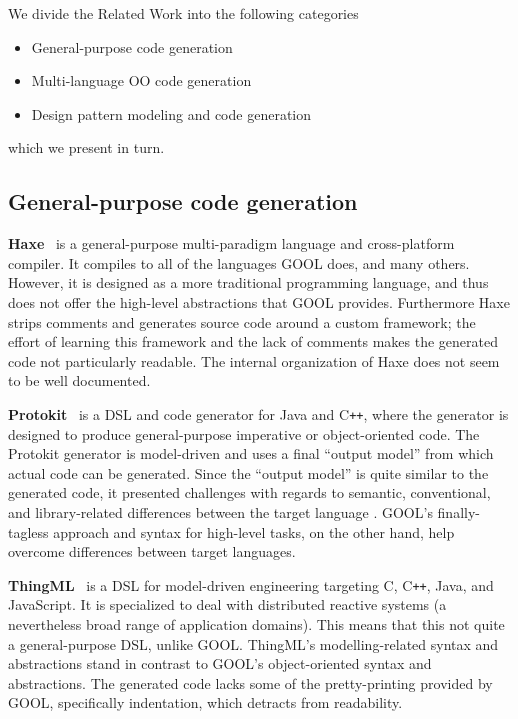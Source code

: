 \documentclass[sigplan,review,anonymous,prologue,dvipsnames]{acmart}
\newcommand{\Cplusplus}{C\texttt{++}}
\begin{document}
We divide the Related Work into the following categories
\begin{itemize}
\item General-purpose code generation
\item Multi-language OO code generation
\item Design pattern modeling and code generation
\end{itemize}
which we present in turn.

\subsection{General-purpose code generation}

\textbf{Haxe}~\cite{Haxe} is a general-purpose multi-paradigm language and cross-platform
compiler.  It compiles to all of the languages GOOL does, and many
others.  However, it is designed as a more traditional programming language, and
thus does not offer the high-level abstractions that GOOL provides. Furthermore
Haxe strips comments and generates source code around a custom framework; 
the effort of learning this framework and the lack of comments makes the generated
code not particularly readable. The internal organization of Haxe does not seem
to be well documented.

\textbf{Protokit}~\cite{kovesdan2017multi} is a DSL and code generator for Java and
\Cplusplus, where the generator is designed to produce
general-purpose imperative or object-oriented code. The Protokit generator is
model-driven and uses a final ``output model'' from which actual code can be
generated. Since the ``output model'' is quite similar to the generated
code, it presented challenges with regards to semantic, conventional, and
library-related differences between the target language
\cite{kovesdan2017multi}. GOOL's finally-tagless approach and syntax for
high-level tasks, on the other hand, help overcome differences between
target languages.

\textbf{ThingML}~\cite{harrand2016thingml} is a DSL for model-driven engineering
targeting C, \Cplusplus, Java, and JavaScript. It is specialized to deal with
distributed reactive systems (a nevertheless broad range of application domains).
This means that this not quite a general-purpose DSL, unlike GOOL.
ThingML's modelling-related syntax and abstractions stand in contrast to GOOL's
object-oriented syntax and abstractions. The generated code lacks some of the
pretty-printing provided by GOOL, specifically indentation, which detracts from
readability.
\end{document}
